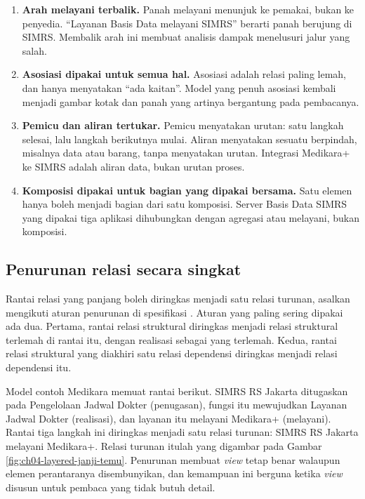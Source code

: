 \begin{enumerate}
  \item \textbf{Arah melayani terbalik.} Panah melayani menunjuk ke pemakai,
        bukan ke penyedia. ``Layanan Basis Data melayani SIMRS'' berarti
        panah berujung di SIMRS. Membalik arah ini membuat analisis dampak
        menelusuri jalur yang salah.
  \item \textbf{Asosiasi dipakai untuk semua hal.} Asosiasi adalah relasi
        paling lemah, dan hanya menyatakan ``ada kaitan''. Model yang penuh
        asosiasi kembali menjadi gambar kotak dan panah yang artinya
        bergantung pada pembacanya.
  \item \textbf{Pemicu dan aliran tertukar.} Pemicu menyatakan urutan: satu
        langkah selesai, lalu langkah berikutnya mulai. Aliran menyatakan
        sesuatu berpindah, misalnya data atau barang, tanpa menyatakan
        urutan. Integrasi Medikara+ ke SIMRS adalah aliran data, bukan
        urutan proses.
  \item \textbf{Komposisi dipakai untuk bagian yang dipakai bersama.} Satu
        elemen hanya boleh menjadi bagian dari satu komposisi. Server Basis
        Data SIMRS yang dipakai tiga aplikasi dihubungkan dengan agregasi
        atau melayani, bukan komposisi.
\end{enumerate}

\subsection*{Penurunan relasi secara singkat}

Rantai relasi yang panjang boleh diringkas menjadi satu relasi turunan,
asalkan mengikuti aturan penurunan di spesifikasi \cite{archimate32}. Aturan
yang paling sering dipakai ada dua. Pertama, rantai relasi struktural
diringkas menjadi relasi struktural terlemah di rantai itu, dengan realisasi
sebagai yang terlemah. Kedua, rantai relasi struktural yang diakhiri satu
relasi dependensi diringkas menjadi relasi dependensi itu.

Model contoh Medikara memuat rantai berikut. SIMRS RS Jakarta ditugaskan pada
Pengelolaan Jadwal Dokter (penugasan), fungsi itu mewujudkan Layanan Jadwal
Dokter (realisasi), dan layanan itu melayani Medikara+ (melayani). Rantai
tiga langkah ini diringkas menjadi satu relasi turunan: SIMRS RS Jakarta
melayani Medikara+. Relasi turunan itulah yang digambar pada Gambar
\ref{fig:ch04-layered-janji-temu}. Penurunan membuat \textit{view} tetap
benar walaupun elemen perantaranya disembunyikan, dan kemampuan ini berguna
ketika \textit{view} disusun untuk pembaca yang tidak butuh detail.

